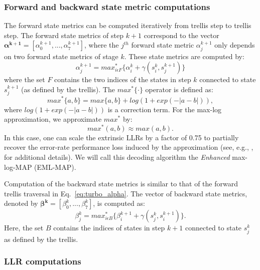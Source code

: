 \subsubsection{Forward and backward state metric computations}

The forward state metrics can be computed iteratively from trellis step to
trellis step. The forward state metrics of step $k+1$ correspond to the vector
$\bm{\alpha^{k+1}} = [\alpha_0^{k+1}, ... ,\alpha_7^{k+1}]$, where the
$j^{th}$ forward state metric $\alpha_j^{k+1}$ only depends on two forward
state metrics of stage $k$. These state metrics are computed by:
\begin{equation}
  \label{eq:turbo_alpha}
  \alpha_j^{k+1} =
  max^*_{i \epsilon F} \{ \alpha_i^k + \gamma(s_i^k, s_j^{k+1}) \}
\end{equation}
where the set $F$ contains the two indices of the states in step $k$ connected
to state $s_j^{k+1}$ (as defined by the trellis). The $max^*\{·\}$ operator is
defined as:
\begin{equation}
   max^*\{a,b\} = max\{a,b\} + log(1 + exp(-|a-b|)),
\end{equation}
where $log(1 + exp(-|a-b|))$ is a correction term. For the max-log
approximation, we approximate $max^*$ by:
\begin{equation*}
   max^*(a, b) \approx max(a, b).
\end{equation*}
In this case, one can scale the extrinsic LLRs by a factor of 0.75 to partially
recover the error-rate performance loss induced by the approximation (see, e.g.,
\cite{Vogt2000}, \cite{Studer2011} for additional details). We will call this
decoding algorithm the \emph{Enhanced} max-log-MAP (EML-MAP).

Computation of the backward state metrics is similar to that of the forward
trellis traversal in Eq.~\ref{eq:turbo_alpha}. The vector of backward state
metrics, denoted by $\bm{\beta^k} = [\beta_0^k, ..., \beta_7^k]$, is
computed as:
\begin{equation}
  \label{eq:turbo_beta}
  \beta_j^k =
  max^*_{i \epsilon B} \{ \beta_i^{k+1} + \gamma(s_j^k, s_i^{k+1}) \}.
\end{equation}
Here, the set $B$ contains the indices of states in step $k+1$ connected to
state $s_j^k$ as defined by the trellis.

\subsubsection{LLR computations}

